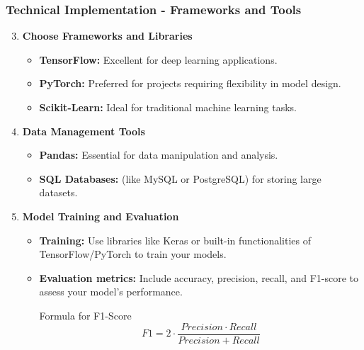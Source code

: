 \documentclass[aspectratio=169]{beamer}
\begin{document}
\begin{frame}[fragile]
    \frametitle{Technical Implementation - Frameworks and Tools}
    \begin{enumerate}
        \setcounter{enumi}{2}
        \item \textbf{Choose Frameworks and Libraries}
        \begin{itemize}
            \item \textbf{TensorFlow:} Excellent for deep learning applications.
            \item \textbf{PyTorch:} Preferred for projects requiring flexibility in model design.
            \item \textbf{Scikit-Learn:} Ideal for traditional machine learning tasks.
        \end{itemize}

        \item \textbf{Data Management Tools}
        \begin{itemize}
            \item \textbf{Pandas:} Essential for data manipulation and analysis.
            \item \textbf{SQL Databases:} (like MySQL or PostgreSQL) for storing large datasets.
        \end{itemize}

        \item \textbf{Model Training and Evaluation}
        \begin{itemize}
            \item \textbf{Training:} Use libraries like Keras or built-in functionalities of TensorFlow/PyTorch to train your models.
            \item \textbf{Evaluation metrics:} Include accuracy, precision, recall, and F1-score to assess your model’s performance.
            \begin{block}{Formula for F1-Score}
            \begin{equation}
                F1 = 2 \cdot \frac{Precision \cdot Recall}{Precision + Recall}
            \end{equation}
            \end{block}
        \end{itemize}
    \end{enumerate}
\end{frame}
\end{document}
